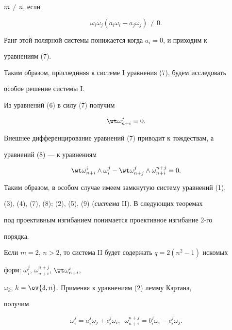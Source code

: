 $m\ne n$, если 


$$ 


\omega_i\omega_j(a_i\omega_i-a_j\omega_j)\ne0. 


$$ 


Ранг этой полярной системы понижается когда $a_i=0$, и приходим к 


уравнениям (7). 


 


Таким образом, присоединяя к системе I уравнения (7), будем исследовать 


особое решение системы I. 


 


Из уравнений (6) в силу (7) получим 


\begin{equation} 


\wt\omega^j_{n+i}=0. 


\end{equation} 


Внешнее дифференцирование уравнений (7) приводит к тождествам, а 


уравнений (8) --- к уравнениям 


\begin{equation} 


\wt\omega^i_{n+i}\wedge\omega^j_i-\wt\omega^j_{n+j}\wedge 


\omega^{n+j}_{n+i}=0. 


\end{equation} 


 


Таким образом, в особом случае имеем замкнутую систему уравнений (1), 


(3), (4), (7), (8); (2), (5), (9) ({\it система} II). В следующих теоремах 


под проективным изгибанием понимается проективное изгибание 2-го 


порядка. 


 


Если $m=2$, $n>2$, то система II будет содержать $q=2(n^2-1)$ искомых 


форм: $\omega^j_i$, $\omega^{n+j}_{n+i}$, $\wt\omega^i_{n+i}$, 


$\omega_k$, $k=\ov{3,n}$. Применяя к уравнениям (2) лемму Картана, 


получим 


\begin{equation} 


\omega^j_i=a^j_i\omega_j+c^j_i\omega_i,\ \; 


\omega^{n+j}_{n+i}=b^j_i\omega_i-c^j_i\omega_j. 


\end{equation} 



